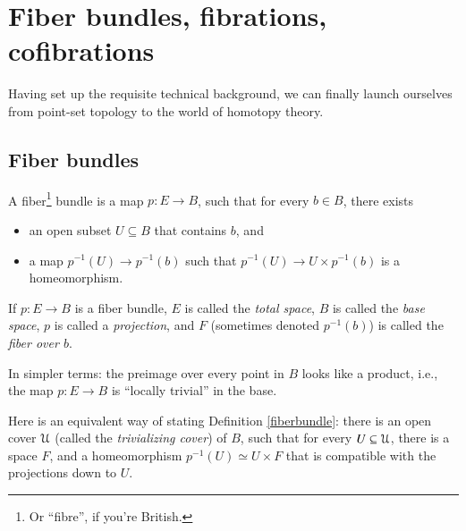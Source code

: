 \section{Fiber bundles, fibrations, cofibrations}
Having set up the requisite technical background, 
we can finally launch ourselves from point-set topology to the world of homotopy theory.
\subsection{Fiber bundles}
\begin{definition}\label{fiberbundle}
    A fiber\footnote{Or ``fibre'', if you're British.} bundle is a map $p:E\to B$,
    such that for every $b\in B$, there exists
    \begin{itemize}
	\item an open subset $U\subseteq B$ that contains $b$, and
	\item a map $p^{-1}(U)\to p^{-1}(b)$ such that $p^{-1}(U)\to U\times p^{-1}(b)$ is a homeomorphism.
    \end{itemize}
    If $p:E\to B$ is a fiber bundle, $E$ is called the \emph{total space}, $B$ is called the
    \emph{base space}, $p$ is called a \emph{projection},
    and $F$ (sometimes denoted $p^{-1}(b)$) is called the \emph{fiber over $b$}.
\end{definition}
In simpler terms: the preimage over every point in $B$ looks like a product,
i.e., the map $p:E\to B$ is ``locally trivial'' in the base.

Here is an equivalent way of stating Definition \ref{fiberbundle}:
there is an open cover $\mathcal U$ (called the \emph{trivializing cover}) of $B$,
such that for every $U\subseteq \mathcal U$,
there is a space $F$, and a homeomorphism
$p^{-1}(U)\simeq U\times F$ that is compatible with the projections down to $U$.

